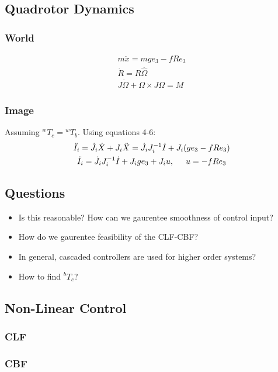 \documentclass{paper}
\begin{document}
\subsection{Quadrotor Dynamics}
\subsubsection{World}
\begin{gather}
m\ddot{x} = mge_{3} - fRe_{3} \\
\dot{R} = R\hat{\Omega} \\
J\dot{\Omega} + \Omega \times J\Omega = M 
\end{gather}
\subsubsection{Image}
Assuming ${}^{w}T_{c} = {}^{w}T_{b}$. Using equations 4-6:
\begin{gather}
\ddot{I_{i}} = \dot{J_{i}}\dot{X} + J_{i}\ddot{X} = \dot{J_{i}}J_{i}^{-1}\dot{I} + J_{i} (ge_{3}-fRe_{3})\\
\ddot{I_{i}} = \dot{J_{i}}J_{i}^{-1}\dot{I} + J_{i}ge_{3} + J_{i}u, \hspace*{5mm}
u = -fRe_{3}
\end{gather}
\subsection{Questions}
\begin{itemize}
\item Is this reasonable? How can we gaurentee smoothness of control input?
\item How do  we gaurentee feasibility of the CLF-CBF?
\item In general, cascaded controllers are used for higher order systems?
\item How to find ${}^bT_{c}$?
\end{itemize}

\subsection{Non-Linear Control}
\subsubsection{CLF}
\subsubsection{CBF}
\end{document}
